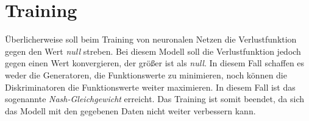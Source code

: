 \section{Training}
Überlicherweise soll beim Training von neuronalen Netzen die Verlustfunktion gegen den Wert \emph{null} streben. Bei diesem Modell soll die Verlustfunktion jedoch gegen einen Wert konvergieren, der größer ist als \emph{null}. In diesem Fall schaffen es weder die Generatoren, die Funktionswerte zu minimieren, noch können die Diskriminatoren die Funktionswerte weiter maximieren. In diesem Fall ist das sogenannte \emph{Nash-Gleichgewicht} erreicht. Das Training ist somit beendet, da sich das Modell mit den gegebenen Daten nicht weiter verbessern kann.